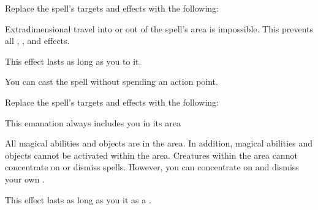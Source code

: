 


Replace the spell's targets and effects with the following:
\begin{spellcontent}

\begin{augmenttargetinginfo}




\end{augmenttargetinginfo}


\begin{augmenteffects}



\spelleffect
Extradimensional travel into or out of the spell's area is impossible.
This prevents all , , and  effects.

This effect lasts as long as you  to it.








\end{augmenteffects}

\end{spellcontent}





You can cast the spell without spending an action point.








Replace the spell's targets and effects with the following:
\begin{spellcontent}

\begin{augmenttargetinginfo}
\spellspecial This emanation always includes you in its area



\end{augmenttargetinginfo}


\begin{augmenteffects}



\spelleffect
All magical abilities and objects are  in the area.
In addition, magical abilities and objects cannot be activated within the area.
Creatures within the area cannot concentrate on or dismiss spells.
However, you can concentrate on and dismiss your own .

This effect lasts as long as you  it as a .








\end{augmenteffects}

\end{spellcontent}




